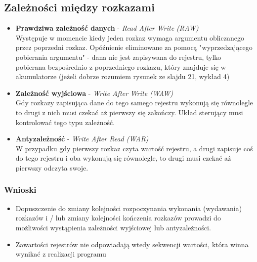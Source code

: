 \documentclass[a4paper,twoside]{article}
\begin{document}
        \subsection*{Zależności między rozkazami}
        	\begin{itemize}
	            \item \textbf{Prawdziwa zależność danych} - \emph{Read After Write (RAW)}\\
	            Występuje w momencie kiedy jeden rozkaz wymaga argumentu obliczanego przez poprzedni rozkaz. Opóźnienie eliminowane za pomocą "wyprzedzającego pobierania argumentu" - dana nie jest zapisywana do rejestru, tylko pobierana bezpośrednio z poprzedniego rozkazu, który znajduje się w akumulatorze (jeżeli dobrze rozumiem rysunek ze slajdu 21, wykład 4)
	            \item \textbf{Zależność wyjściowa} - \emph{Write After Write (WAW)}\\
	            Gdy rozkazy zapisująca dane do tego samego rejestru wykonują się równolegle to drugi z nich musi czekać aż pierwszy się zakończy. Układ sterujący musi kontrolować tego typu zależność.
	            \item \textbf{Antyzależność} - \emph{Write After Read (WAR)}\\
	            W przypadku gdy pierwszy rozkaz czyta wartość rejestru, a drugi zapisuje coś do tego rejestru i oba wykonują się równolegle, to drugi musi czekać aż pierwszy odczyta swoje.
            \end{itemize}
            \subsubsection*{Wnioski}
            \begin{itemize}
            	\item Dopuszczenie do zmiany kolejności rozpoczynania wykonania (wydawania) rozkazów i / lub zmiany kolejności kończenia rozkazów prowadzi do możliwości wystąpienia zależności wyjściowej lub antyzależności.
            	\item Zawartości rejestrów nie odpowiadają wtedy sekwencji wartości, która winna wynikać z realizacji programu
            \end{itemize}
            
\end{document}
